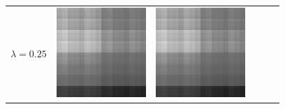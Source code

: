 \documentclass[11pt,a4paper,openright,oneside]{book}
\numberwithin{equation}{section}
\begin{document}
{\begin{figure}[h]
\begin{adjustwidth}{-3cm}{-3cm}
\begin{tabular}{>{\centering\arraybackslash}m{1.5cm} m{2.5cm} m{2.5cm} m{2.5cm} m{2.5cm} m{2.5cm}}
        $\lambda = 0.25$ &
        \includegraphics[width=\linewidth]{media/tnale/AAAfruits-comp1-ale-0.25.png} &
        \includegraphics[width=\linewidth]{media/tnale/AAAfruits-comp2-ale-0.25.png} &

\end{tabular}
\end{adjustwidth}
\end{figure}}
\end{document}
